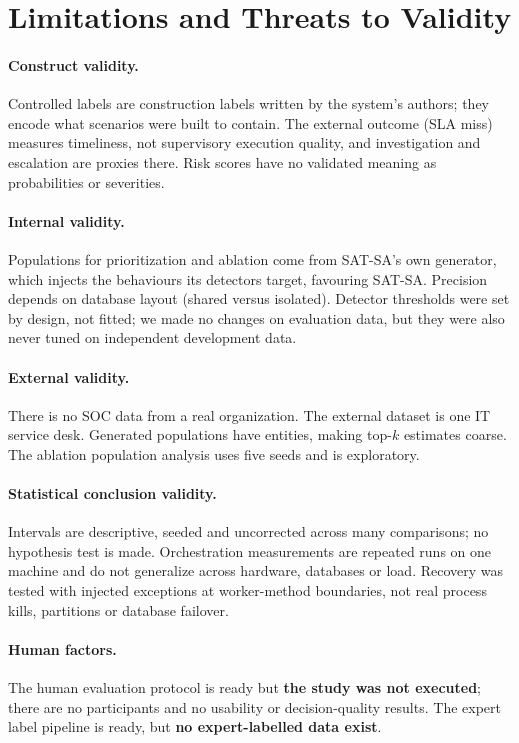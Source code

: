 \section{Limitations and Threats to Validity}
\label{sec:limitations}

\paragraph{Construct validity.}
Controlled labels are construction labels written by the system's authors; they
encode what scenarios were built to contain. The external outcome (SLA miss)
measures timeliness, not supervisory execution quality, and investigation and
escalation are proxies there. Risk scores have no validated meaning as
probabilities or severities.

\paragraph{Internal validity.}
Populations for prioritization and ablation come from SAT-SA's own generator,
which injects the behaviours its detectors target, favouring SAT-SA. Precision
depends on database layout (shared versus isolated). Detector thresholds were set
by design, not fitted; we made no changes on evaluation data, but they were also
never tuned on independent development data.

\paragraph{External validity.}
There is no SOC data from a real organization. The external dataset is one IT
service desk. Generated populations have  entities, making top-$k$
estimates coarse. The ablation population analysis uses five seeds and is
exploratory.

\paragraph{Statistical conclusion validity.}
Intervals are descriptive, seeded and uncorrected across many comparisons; no
hypothesis test is made. Orchestration measurements are repeated runs on one
machine and do not generalize across hardware, databases or load. Recovery was
tested with injected exceptions at worker-method boundaries, not real process
kills, partitions or database failover.

\paragraph{Human factors.}
The human evaluation protocol is ready but \textbf{the study was not executed};
there are no participants and no usability or decision-quality results. The expert
label pipeline is ready, but \textbf{no expert-labelled data exist}.

